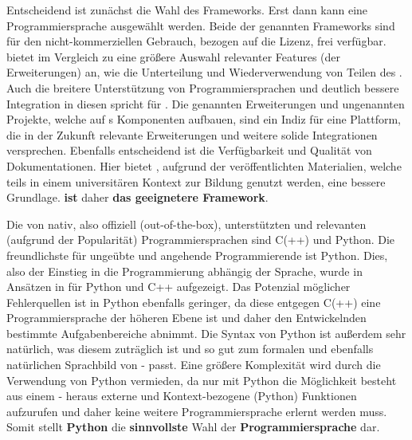 Entscheidend ist zunächst die Wahl des Frameworks.
Erst dann kann eine Programmiersprache ausgewählt werden.
Beide der genannten Frameworks sind für den nicht-kommerziellen Gebrauch, bezogen auf die Lizenz, frei verfügbar.
 bietet im Vergleich zu  eine größere Auswahl relevanter Features (\inkl der Erweiterungen) an, wie die Unterteilung und Wiederverwendung von Teilen des .
Auch die breitere Unterstützung von Programmiersprachen und deutlich bessere Integration in diesen spricht für .
Die genannten Erweiterungen und ungenannten Projekte, welche auf s Komponenten aufbauen, sind ein Indiz für eine Plattform, die in der Zukunft relevante Erweiterungen und weitere solide Integrationen versprechen.
Ebenfalls entscheidend ist die Verfügbarkeit und Qualität von Dokumentationen.
Hier bietet , aufgrund der veröffentlichten Materialien, welche teils in einem universitären Kontext zur Bildung genutzt werden, eine bessere Grundlage.
\textbf{ ist} daher \textbf{das geeignetere Framework}.

Die von  nativ, also offiziell (out-of-the-box), unterstützten und relevanten (aufgrund der Popularität) Programmiersprachen sind C(++) und Python.
Die freundlichste für ungeübte und angehende Programmierende ist Python.
Dies, also der Einstieg in die Programmierung abhängig der Sprache, wurde in Ansätzen in  für Python und C++ aufgezeigt.
Das Potenzial möglicher Fehlerquellen ist in Python ebenfalls geringer, da diese entgegen C(++) eine Programmiersprache der höheren Ebene ist und daher den Entwickelnden bestimmte Aufgabenbereiche abnimmt.
Die Syntax von Python ist außerdem sehr natürlich, was diesem zuträglich ist und so gut zum formalen und ebenfalls natürlichen Sprachbild von - passt.
Eine größere Komplexität wird durch die Verwendung von Python vermieden, da nur mit Python die Möglichkeit besteht aus einem - heraus externe und Kontext-bezogene (Python) Funktionen aufzurufen und daher keine weitere Programmiersprache erlernt werden muss.
Somit stellt \textbf{Python} die \textbf{sinnvollste} Wahl der \textbf{Programmiersprache} dar.
